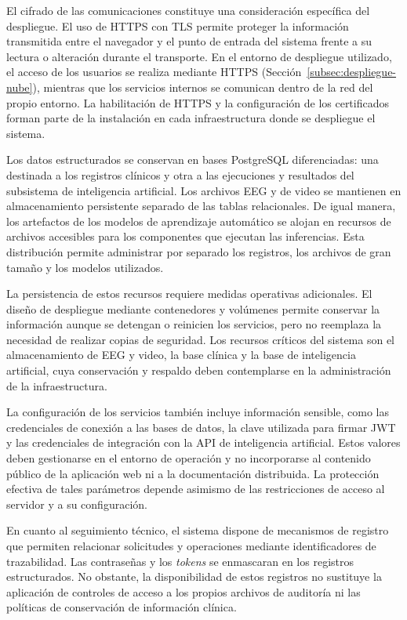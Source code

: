 El cifrado de las comunicaciones constituye una consideración específica del despliegue. El uso de HTTPS con TLS permite proteger la información transmitida entre el navegador y el punto de entrada del sistema frente a su lectura o alteración durante el transporte. En el entorno de despliegue utilizado, el acceso de los usuarios se realiza mediante HTTPS (Sección~\ref{subsec:despliegue-nube}), mientras que los servicios internos se comunican dentro de la red del propio entorno. La habilitación de HTTPS y la configuración de los certificados forman parte de la instalación en cada infraestructura donde se despliegue el sistema.

Los datos estructurados se conservan en bases PostgreSQL diferenciadas: una destinada a los registros clínicos y otra a las ejecuciones y resultados del subsistema de inteligencia artificial. Los archivos EEG y de video se mantienen en almacenamiento persistente separado de las tablas relacionales. De igual manera, los artefactos de los modelos de aprendizaje automático se alojan en recursos de archivos accesibles para los componentes que ejecutan las inferencias. Esta distribución permite administrar por separado los registros, los archivos de gran tamaño y los modelos utilizados.

La persistencia de estos recursos requiere medidas operativas adicionales. El diseño de despliegue mediante contenedores y volúmenes permite conservar la información aunque se detengan o reinicien los servicios, pero no reemplaza la necesidad de realizar copias de seguridad. Los recursos críticos del sistema son el almacenamiento de EEG y video, la base clínica y la base de inteligencia artificial, cuya conservación y respaldo deben contemplarse en la administración de la infraestructura.

La configuración de los servicios también incluye información sensible, como las credenciales de conexión a las bases de datos, la clave utilizada para firmar JWT y las credenciales de integración con la API de inteligencia artificial. Estos valores deben gestionarse en el entorno de operación y no incorporarse al contenido público de la aplicación web ni a la documentación distribuida. La protección efectiva de tales parámetros depende asimismo de las restricciones de acceso al servidor y a su configuración.

En cuanto al seguimiento técnico, el sistema dispone de mecanismos de registro que permiten relacionar solicitudes y operaciones mediante identificadores de trazabilidad. Las contraseñas y los \textit{tokens} se enmascaran en los registros estructurados. No obstante, la disponibilidad de estos registros no sustituye la aplicación de controles de acceso a los propios archivos de auditoría ni las políticas de conservación de información clínica.

